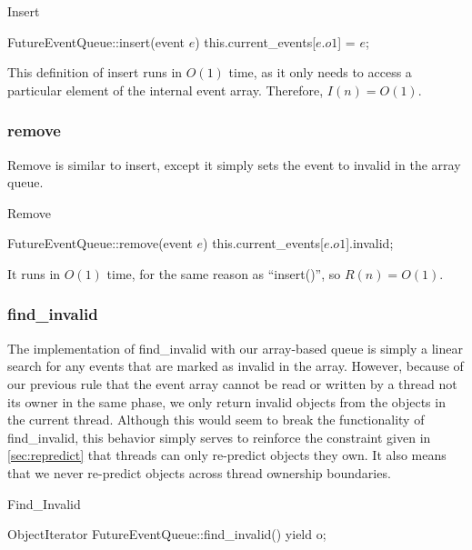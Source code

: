 \documentclass[CEJCS,PDF]{cej} %
\begin{document}
\begin{algorithm}
\caption{Insert}
\begin{algorithmic}
\STATE FutureEventQueue::insert(event $e$)
	\STATE this.current\_events[$e.o1$] = $e$;
\ENDIF
\end{algorithmic}
\end{algorithm}

This definition of insert runs in $O(1)$ time, as it only needs to access a particular element of the internal event array.  Therefore, $I(n)=O(1)$.

\subsubsection{remove}

Remove is similar to insert, except it simply sets the event to invalid in the array queue.

\begin{algorithm}
\caption{Remove}
\begin{algorithmic}
\STATE FutureEventQueue::remove(event $e$)
\STATE this.current\_events[$e.o1$].invalid;
\end{algorithmic}
\end{algorithm}

It runs in $O(1)$ time, for the same reason as ``insert()'', so $R(n)=O(1)$.

\subsubsection{find\_invalid}

The implementation of find\_invalid with our array-based queue is simply a linear search for any events that are marked as invalid in the array.
However, because of our previous rule that the event array cannot be read or written by a thread not its owner in the same phase, we only return invalid
objects from the objects in the current thread.  Although this would seem to break the functionality of find\_invalid, this behavior simply serves to reinforce
the constraint given in \ref{sec:repredict} that threads can only re-predict objects they own. It also means that we never re-predict objects across thread
ownership boundaries.  

\begin{algorithm}
\caption{Find\_Invalid}
\begin{algorithmic}
\STATE ObjectIterator FutureEventQueue::find\_invalid()
		\STATE {}
		\STATE yield o;
	\ENDIF
\ENDFOR
\end{algorithmic}
\end{algorithm}
\end{document}
